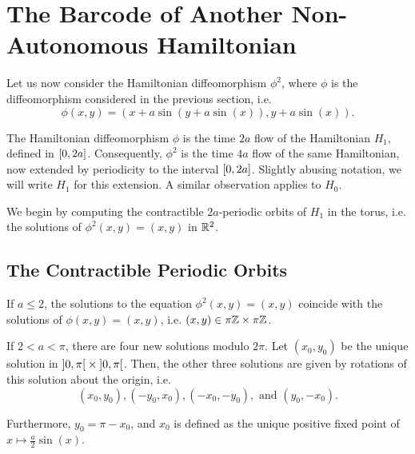 \chapter{The Barcode of Another Non-Autonomous Hamiltonian}
\label{chap:secondexample}

Let us now consider the Hamiltonian diffeomorphism $\phi^2$, where $\phi$ is the diffeomorphism considered in the previous section, i.e.
\begin{equation}
\phi(x,y) = ( x + a \sin(y + a \sin(x)), y + a \sin(x)).
\end{equation}

The Hamiltonian diffeomorphism $\phi$ is the time $2a$ flow of the Hamiltonian $H_1$, defined in $\interval 0 {2a}$. Consequently, $\phi^2$ is the time $4a$ flow of the same Hamiltonian, now extended by periodicity to the interval $\interval 0 {2a}$. Slightly abusing notation, we will write $H_1$ for this extension. A similar observation applies to $H_0$.

We begin by computing the contractible $2a$-periodic orbits of $H_1$ in the torus, i.e. the solutions of $\phi^2(x,y) = (x,y)$ in $\mathbb{R}^2$.

\section{The Contractible Periodic Orbits}

\begin{prop}\label{prop:orbitsphi2}
If $a \leq 2$, the solutions to the equation $\phi^2(x,y) = (x,y)$ coincide with the solutions of $\phi(x,y) = (x,y)$, i.e. $(x,y) \in \pi \mathbb{Z} \times \pi \mathbb{Z}$.

If $2 < a < \pi$, there are four new solutions modulo $2\pi$. Let $(x_0, y_0)$ be the unique solution in $\ointerval 0 \pi \times \ointerval 0 \pi$. Then, the other three solutions are given by rotations of this solution about the origin, i.e.
\begin{equation}
(x_0, y_0), (-y_0, x_0), (-x_0, -y_0), \text{ and } (y_0, -x_0).
\end{equation}

Furthermore, $y_0 = \pi - x_0$, and $x_0$ is defined as the unique positive fixed point of $x \mapsto \frac a 2 \sin(x)$.
\end{prop}

